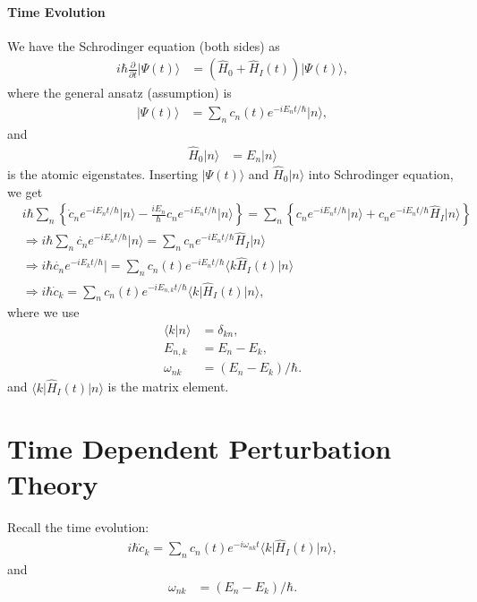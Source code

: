 \documentclass[../../note.tex]{subfiles}
\begin{document}
\paragraph{Time Evolution}
We have the Schrodinger equation (both sides) as 
\begin{align}
    i \hbar \frac{\partial}{ \partial t} \vert \Psi(t) \rangle 
    &= (\hat{H}_0 + \hat{H}_I(t))\vert \Psi(t) \rangle,
\end{align}
where the general ansatz (assumption) is 
\begin{align}
    \vert \Psi(t) \rangle
    &= \sum_{n} c_n(t) e^{-i E_n t/\hbar} \vert n \rangle,
\end{align}
and 
\begin{align}
    \hat{H}_0 \vert n \rangle
    &= E_n \vert n \rangle
\end{align}
is the atomic eigenstates. Inserting $\vert \Psi(t) \rangle$ and $\hat{H}_0 \vert n \rangle$ into Schrodinger equation, we get
\begin{align}
    &i \hbar \sum_n \left\{\dot{c}_n e^{-i E_n t/\hbar} \vert n \rangle - \frac{i E_n}{\hbar} c_n e^{-i E_n t/\hbar} \vert n \rangle \right\} 
    = \sum_n \left\{c_n e^{-i E_n t/\hbar} \vert n \rangle + c_n e^{-i E_n t /\hbar} \hat{H}_I \vert n \rangle \right\} \\
    &\Longrightarrow i \hbar \sum_n \dot{c_n}e^{-i E_n t /\hbar} \vert n \rangle = \sum_n c_n e^{-i E_n t /\hbar} \hat{H}_I \vert n \rangle \\
    &\Longrightarrow i \hbar \dot{c_n}e^{-i E_k t /\hbar} \vert= \sum_n c_n(t) e^{-i E_n t/\hbar} \langle k \hat{H}_I(t)\vert n \rangle \\
    &\Longrightarrow i \hbar\dot{c}_k = \sum_n c_n(t) e^{-i E_{n,k} t / \hbar} \langle k \vert \hat{H}_I(t) \vert n \rangle,
\end{align}
where we use
\begin{align}
    \langle k \vert n \rangle 
    &= \delta_{k n}, \\
    E_{n,k}
    &= E_n - E_k, \\
    \omega_{nk}
    &= (E_n - E_k)/\hbar.
\end{align}
and $\langle k \vert \hat{H}_I(t) \vert n \rangle$ is the matrix element.

\section{Time Dependent Perturbation Theory}
Recall the time evolution:
\begin{align}
    i \hbar\dot{c}_k = \sum_n c_n(t) e^{-i \omega_{nk} t} \langle k \vert \hat{H}_I(t) \vert n \rangle,
\end{align}
and
\begin{align}
    \omega_{nk}
    &= (E_n - E_k)/\hbar.
\end{align}
\end{document}

